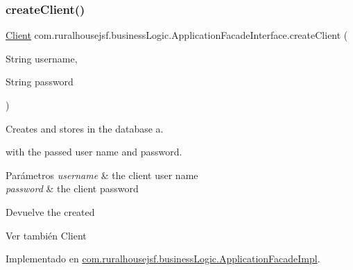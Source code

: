 \subsubsection{\texorpdfstring{createClient()}{createClient()}}
{\footnotesize\ttfamily \mbox{\hyperlink{a00164}{Client}} com.\+ruralhousejsf.\+business\+Logic.\+Application\+Facade\+Interface.\+create\+Client (\begin{DoxyParamCaption}\item[{String}]{username,  }\item[{String}]{password }\end{DoxyParamCaption})}



Creates and stores in the database a. 


\begin{DoxyCode}{0}
\end{DoxyCode}
 with the passed user name and password.


\begin{DoxyParams}{Parámetros}
{\em username} & the client user name \\
\hline
{\em password} & the client password\\
\hline
\end{DoxyParams}
\begin{DoxyReturn}{Devuelve}
the created
\begin{DoxyCode}{0}
\end{DoxyCode}

\end{DoxyReturn}
\begin{DoxySeeAlso}{Ver también}
Client 
\end{DoxySeeAlso}


Implementado en \mbox{\hyperlink{a00132_ae48e63f3df5226e46e4a57a64d120823}{com.\+ruralhousejsf.\+business\+Logic.\+Application\+Facade\+Impl}}.

\mbox{\label{a00136_a5a056a1b07c8ee83c1d540812b0a880d}} 
